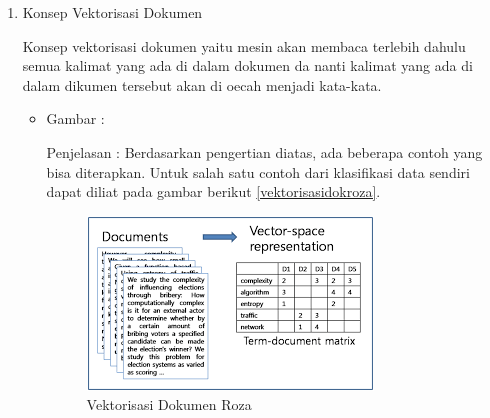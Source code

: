 \begin{enumerate}
\item Konsep Vektorisasi Dokumen 
\par Konsep vektorisasi dokumen yaitu mesin akan membaca terlebih dahulu semua kalimat yang ada di dalam dokumen da nanti kalimat yang ada di dalam dikumen tersebut akan di oecah menjadi kata-kata.
\par
\begin{itemize}
\item Gambar :
\par Penjelasan : Berdasarkan pengertian diatas, ada beberapa contoh yang bisa diterapkan. Untuk salah satu contoh dari klasifikasi data sendiri dapat diliat pada gambar berikut \ref{vektorisasidokroza}.
\begin{figure}[!hbtp]
\centering
\includegraphics[scale=0.7]{figures/vektorisasidokroza.png}
\caption{Vektorisasi Dokumen Roza}
\label{text-fadila}
\end{figure}
\end{itemize}


\end{enumerate}
